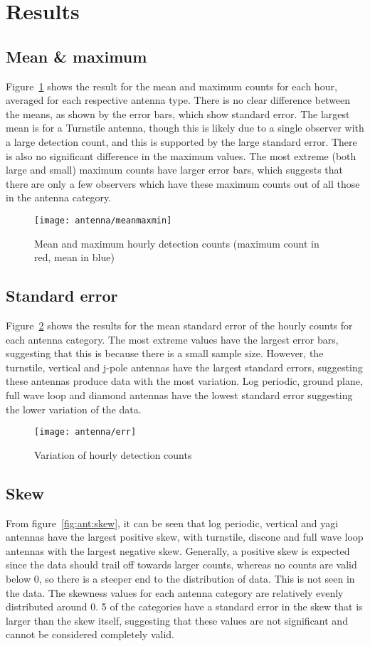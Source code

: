 \section{Results}
\subsection{Mean \& maximum}
Figure~\ref{fig:ant:meanmaxmin} shows the result for the mean and maximum counts for each hour, averaged for each respective antenna type. There is no clear difference between the means, as shown by the error bars, which show standard error. The largest mean is for a Turnstile antenna, though this is likely due to a single observer with a large detection count, and this is supported by the large standard error. There is also no significant difference in the maximum values. The most extreme (both large and small) maximum counts have larger error bars, which suggests that there are only a few observers which have these maximum counts out of all those in the antenna category.

\begin{figure}[h!]
	\centering
	\texttt{[image: antenna/meanmaxmin]}
	\caption{Mean and maximum hourly detection counts (maximum count in red, mean in blue)
		\label{fig:ant:meanmaxmin}}
\end{figure}

\subsection{Standard error}
Figure~\ref{fig:ant:err} shows the results for the mean standard error of the hourly counts for each antenna category. The most extreme values have the largest error bars, suggesting that this is because there is a small sample size. However, the turnstile, vertical and j-pole antennas have the largest standard errors, suggesting these antennas produce data with the most variation. Log periodic, ground plane, full wave loop and diamond antennas have the 
lowest standard error suggesting the lower variation of the data.

\begin{figure}[h!]
	\centering
	\texttt{[image: antenna/err]}
	\caption{Variation of hourly detection counts
		\label{fig:ant:err}}
\end{figure}

\subsection{Skew}
From figure~\ref{fig:ant:skew}, it can be seen that log periodic, vertical and yagi antennas have the largest positive skew, with turnstile, discone and full wave loop antennas with the largest negative skew. Generally, a positive skew is expected since the data should trail off towards larger counts, whereas no counts are valid below 0, so there is a steeper end to the distribution of data. This is not seen in the data. The skewness values for each antenna category are relatively evenly distributed around 0. 5 of the categories have a standard error in the skew that is larger than the skew itself, suggesting that these values are not significant and cannot be considered completely valid.

